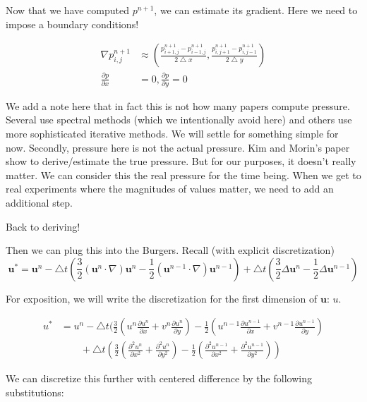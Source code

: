 \documentclass[12pt]{article}
\begin{document}
Now that we have computed $p^{n+1}$, we can estimate its gradient. Here we need to impose a boundary conditions!

\begin{align*}
    \nabla p^{n+1}_{i,j} &\approx (\frac{p^{n+1}_{i+1,j} - p^{n+1}_{i-1,j}}{2\bigtriangleup x}, \frac{p^{n+1}_{i,j+1} - p^{n+1}_{i,j-1}}{2\bigtriangleup y}) \\
    \frac{\partial p}{\partial x} &= 0,
    \frac{\partial p}{\partial y} = 0
\end{align*}

We add a note here that in fact this is not how many papers compute pressure. Several use spectral methods (which we intentionally avoid here) and others use more sophisticated iterative methods. We will settle for something simple for now. Secondly, pressure here is not the actual pressure. Kim and Morin's paper show to derive/estimate the true pressure. But for our purposes, it doesn't really matter. We can consider this the real pressure for the time being. When we get to real experiments where the magnitudes of values matter, we need to add an additional step.

Back to deriving!

Then we can plug this into the Burgers. Recall (with explicit discretization)
\begin{equation}
    \mathbf{u}^* = \mathbf{u}^n - \bigtriangleup t (\frac{3}{2}(\mathbf{u}^n \cdot \nabla)\mathbf{u}^n - \frac{1}{2}(\mathbf{u}^{n-1} \cdot \nabla)\mathbf{u}^{n-1}) + \bigtriangleup t (\frac{3}{2}\Delta \mathbf{u}^n - \frac{1}{2} \Delta \mathbf{u}^{n-1})
\end{equation}

For exposition, we will write the discretization for the first dimension of $\mathbf{u}$: $u$.

\begin{align*}
u^* &= u^n - \bigtriangleup t (\frac{3}{2}(u^n\frac{\partial u^n}{\partial x} + v^n \frac{\partial u^n}{\partial y}) - \frac{1}{2}(u^{n-1}\frac{\partial u^{n-1}}{\partial x} + v^{n-1} \frac{\partial u^{n-1}}{\partial y}) \\
    &\qquad + \bigtriangleup t (\frac{3}{2}(\frac{\partial^2 u^n}{\partial x^2} + \frac{\partial^2 u^n}{\partial y^2}) - \frac{1}{2}(\frac{\partial^2 u^{n-1}}{\partial x^2} + \frac{\partial^2 u^{n-1}}{\partial y^2}))
\end{align*}

We can discretize this further with centered difference by the following substitutions:
\end{document}
